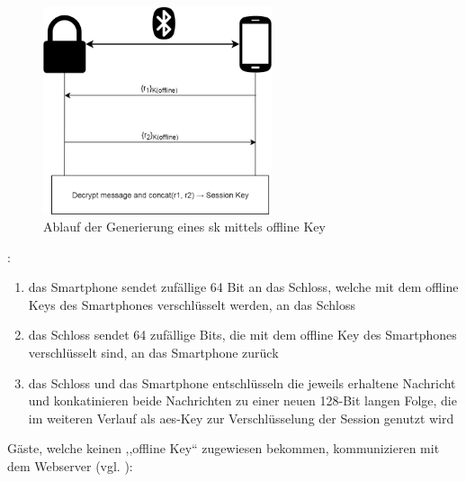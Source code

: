 		\begin{figure}[!htbp]
    		\centering
    		\includegraphics[width=0.6\textwidth]{graphics/owner_key.png}
    		\caption[Generierung eines Session Keys mittels Offline Key]{Ablauf der Generierung eines \gls{sk} mittels offline Key\cite{Fuller2017}}
    		\label{fig:owner_key}
    	\end{figure}
		
		\noindent{}:
        \begin{enumerate}[noitemsep]
            \item das Smartphone sendet zufällige 64 Bit an das Schloss, welche mit dem offline Keys des Smartphones verschlüsselt werden, an das Schloss
            \item das Schloss sendet 64 zufällige Bits, die mit dem offline Key des Smartphones verschlüsselt sind, an das Smartphone zurück
            \item das Schloss und das Smartphone entschlüsseln die jeweils erhaltene Nachricht und konkatinieren beide Nachrichten zu einer neuen 128-Bit langen Folge, die im weiteren Verlauf als \gls{aes}-Key zur Verschlüsselung der Session genutzt wird
        \end{enumerate}
        
        \noindent Gäste, welche keinen ,,offline Key`` zugewiesen bekommen, kommunizieren mit dem Webserver (vgl. ):
        
